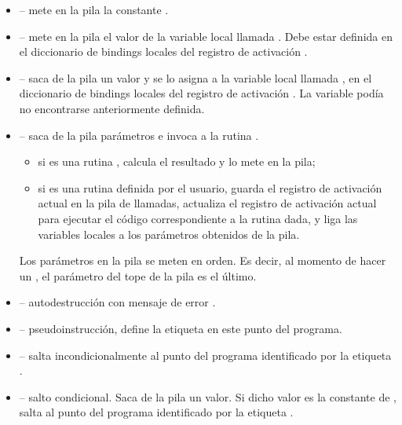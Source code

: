 \documentclass{article}
\begin{document}
\begin{itemize}
\item {} --
mete en la pila la constante .

\item {} --
mete en la pila el valor de la variable local
llamada . Debe estar definida en
el diccionario de bindings locales del registro
de activaci\'on .

\item {} --
saca de la pila un valor y se lo asigna a la
variable local llamada , en el
diccionario de bindings locales del registro
de activaci\'on . La variable pod\'ia
no encontrarse anteriormente definida.

\item {} --
saca de la pila  par\'ametros e
invoca a la rutina .
\begin{itemize}
\item si  es una rutina ,
      calcula el resultado y lo mete en la pila;
\item si  es una rutina definida por
      el usuario, guarda el registro de activaci\'on
      actual en la pila de llamadas, actualiza el
      registro de activaci\'on actual para ejecutar
      el c\'odigo correspondiente a la rutina
      dada, y liga las variables locales a los
      par\'ametros obtenidos de la pila.
\end{itemize}
Los par\'ametros en la pila se meten en orden.
Es decir, al momento de hacer un ,
el par\'ametro del tope de la pila es el \'ultimo.

\item {} -- autodestrucci\'on con mensaje
de error .

\item {} -- pseudoinstrucci\'on,
define la etiqueta  en este punto del
programa.

\item {} -- salta incondicionalmente
al punto del programa identificado por la etiqueta
.

\item {} --
salto condicional. Saca de la pila un valor.
Si dicho valor es la constante  de \Gbs,
salta al punto del programa
identificado por la etiqueta .


\end{itemize}
\end{document}
